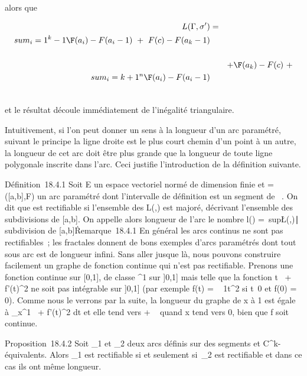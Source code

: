 \documentclass[]{article}
\begin{document}
alors que

\begin{align*} L(\Gamma,\sigma')& =&
\\sum
_i=1^k-1\F(a_ i) -
F(a_i-1)\ +\
F(c) - F(a_k-1)\\%
\\ & &
+\F(a_k) -
F(c)\ + \\sum
_i=k+1^n\F(a_ i) -
F(a_i-1)\\%
\\ \end{align*}

et le résultat découle immédiatement de l'inégalité triangulaire.

Intuitivement, si l'on peut donner un sens à la longueur d'un arc
paramétré, suivant le principe la ligne droite est le plus court chemin
d'un point à un autre, la longueur de cet arc doit être plus grande que
la longueur de toute ligne polygonale inscrite dans l'arc. Ceci justifie
l'introduction de la définition suivante.

Définition~18.4.1 Soit E un espace vectoriel normé de dimension finie et
\Gamma = ([a,b],F) un arc paramétré dont l'intervalle de définition est
un segment de \mathbb{R}~. On dit que \Gamma est rectifiable si l'ensemble des L(\Gamma,\sigma)
est majoré, \sigma décrivant l'ensemble des subdivisions de [a,b]. On
appelle alors longueur de l'arc \Gamma le nombre l(\Gamma)
=\
sup\L(\Gamma,\sigma)∣\sigma\text
subdivision de [a,b]\.

Remarque~18.4.1 En général les arcs continus ne sont pas rectifiables~;
les fractales donnent de bons exemples d'arcs paramétrés dont tout sous
arc est de longueur infini. Sans aller jusque là, nous pouvons
construire facilement un graphe de fonction continue qui n'est pas
rectifiable. Prenons une fonction continue sur [0,1], de classe
\mathcal{C}^1 sur ]0,1] mais telle que la fonction
t\mapsto~\sqrt1 +
f'(t)^2 ne soit pas intégrable sur ]0,1] (par exemple
f(t) = \sqrttsin~
1\over  t^2 si
t\neq~0 et f(0) = 0). Comme nous le verrons par
la suite, la longueur du graphe de x à 1 est égale à
\int  _x^1~\sqrt1
+ f'(t)^2 dt et elle tend vers + \infty~ quand x tend vers 0,
bien que f soit continue.

Proposition~18.4.2 Soit \Gamma_1 et \Gamma_2 deux arcs définis
sur des segments et C^k-équivalents. Alors \Gamma_1 est
rectifiable si et seulement si~\Gamma_2 est rectifiable et dans ce
cas ils ont même longueur.
\end{document}
